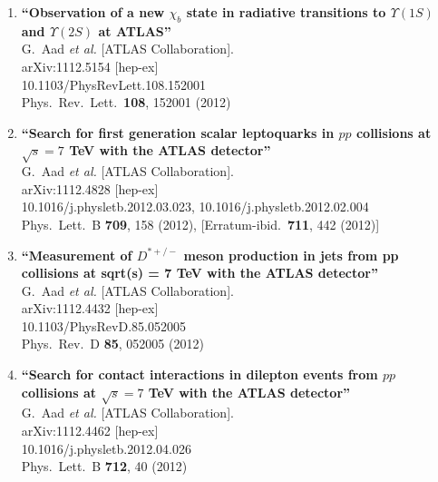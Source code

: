\documentclass{article}
\begin{document}
\begin{enumerate}
\item%
{\bf ``Observation of a new $\chi_b$ state in radiative transitions to $\Upsilon(1S)$ and $\Upsilon(2S)$ at ATLAS''}
  \\{}G.~Aad {\it et al.}  [ATLAS Collaboration].
  \\{}arXiv:1112.5154 [hep-ex]
    \\{}10.1103/PhysRevLett.108.152001
\\{}Phys.\ Rev.\ Lett.\  {\bf 108}, 152001 (2012) %


\item%
{\bf ``Search for first generation scalar leptoquarks in $pp$ collisions at $\sqrt{s}=7$ TeV with the ATLAS detector''}
  \\{}G.~Aad {\it et al.}  [ATLAS Collaboration].
  \\{}arXiv:1112.4828 [hep-ex]
    \\{}10.1016/j.physletb.2012.03.023, 10.1016/j.physletb.2012.02.004
\\{}Phys.\ Lett.\ B {\bf 709}, 158 (2012), [Erratum-ibid.\  {\bf 711}, 442 (2012)] %


\item%
{\bf ``Measurement of $D^{*+/-}$ meson production in jets from pp collisions at sqrt(s) = 7 TeV with the ATLAS detector''}
  \\{}G.~Aad {\it et al.}  [ATLAS Collaboration].
  \\{}arXiv:1112.4432 [hep-ex]
    \\{}10.1103/PhysRevD.85.052005
\\{}Phys.\ Rev.\ D {\bf 85}, 052005 (2012) %


\item%
{\bf ``Search for contact interactions in dilepton events from $pp$ collisions at $\sqrt{s}=7$ TeV with the ATLAS detector''}
  \\{}G.~Aad {\it et al.}  [ATLAS Collaboration].
  \\{}arXiv:1112.4462 [hep-ex]
    \\{}10.1016/j.physletb.2012.04.026
\\{}Phys.\ Lett.\ B {\bf 712}, 40 (2012) %



\end{enumerate}
\end{document}
